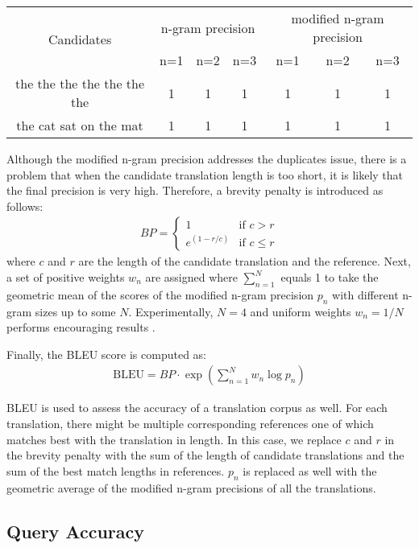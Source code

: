 \begin{table}[h]
\label{table:modified n-gram}
\centering
\caption{}
\begin{tabular}{c|ccc|ccc}
\multirow{2}{*}{ Candidates } & \multicolumn{3}{c|}{ n-gram precision } & \multicolumn{3}{c}{ modified n-gram precision } \\
\cline{2-7}
& n=1 & n=2 & n=3 & n=1 & n=2 & n=3 \\
\hline
the the the the the the the & 1 & 1 & 1 & 1 & 1 & 1 \\
\hline
the cat sat on the mat & 1 & 1 & 1 & 1 & 1 & 1 \\
\end{tabular}
\end{table}

Although the modified n-gram precision addresses the duplicates issue, there is a problem that when the candidate translation length is too short, it is likely that the final precision is very high. Therefore, a brevity penalty is introduced as follows:
\begin{align*}
BP = \left\{
\begin{array}{lc}
1 & \text{if } c > r \\
e^{(1-r/c)} & \text{if } c \leq r
\end{array}\right.
\end{align*}
where $ c $ and $ r $ are the length of the candidate translation and the reference. Next, a set of positive weights $ w_{n} $ are assigned where $ \sum_{n=1}^{N} $ equals 1 to take the geometric mean of the scores of the modified n-gram precision $ p_{n} $ with different n-gram sizes up to some $ N $. Experimentally, $ N=4 $ and uniform weights $ w_{n} = 1/N $ performs encouraging results \cite{Papineni2002}. 

Finally, the BLEU score is computed as:
\begin{align*}
\text{BLEU} = BP\cdot \exp(\sum_{n=1}^{N}w_{n}\log p_{n})
\end{align*}

BLEU is used to assess the accuracy of a translation corpus as well. For each translation, there might be multiple corresponding references one of which matches best with the translation in length. In this case, we replace $ c $ and $ r $ in the brevity penalty with the sum of the length of candidate translations and the sum of the best match lengths in references. $ p_{n} $ is replaced as well with the geometric average of the modified n-gram precisions of all the translations. 

\subsection{Query Accuracy}


